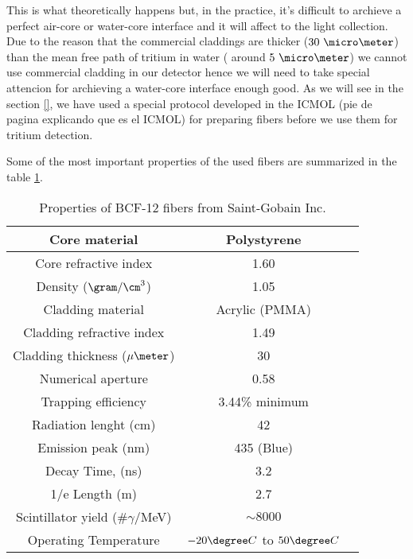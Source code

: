 This is what theoretically happens but, in the practice, it's difficult to archieve a perfect air-core or water-core interface and it will affect to the light collection. Due to the reason that the commercial claddings are thicker ($30~\micro \meter$) than the mean free path of tritium in water ( around $5~\micro\meter$) we cannot use commercial cladding in our detector hence we will need to take special attencion for archieving a water-core interface enough good. As we will see in the section \ref{}, we have used a special protocol developed in the ICMOL (pie de pagina explicando que es el ICMOL) for preparing fibers before we use them for tritium detection.

Some of the most important properties of the used fibers are summarized in the table \ref{tab:ParametersFibersBCF12}.

\begin{table}[htbp]
\begin{center}
\begin{tabular}{|c|c|c|}
\hline \hline 
Core material & Polystyrene \\ \hline
Core refractive index & 1.60 \\ \hline
Density ($\gram/\cm^3$) & 1.05 \\ \hline
Cladding material & Acrylic (PMMA) \\ \hline
Cladding refractive index & 1.49 \\ \hline
Cladding thickness ($\mu\meter$) & 30 \\ \hline
Numerical aperture & 0.58 \\ \hline
Trapping efficiency & 3.44\% minimum \\ \hline
Radiation lenght (cm) & 42 \\ \hline
Emission peak (nm) & 435 (Blue) \\ \hline
Decay Time, (ns) & 3.2 \\ \hline
1/e Length (m) & 2.7 \\ \hline
Scintillator yield (\#$\gamma$/MeV) & $\sim 8000$ \\ \hline
Operating Temperature & $-20\degree C$ to $50\degree C$ \\ \hline
\end{tabular}
\caption{Properties of BCF-12 fibers from Saint-Gobain Inc. \cite{DataSheetBCF12Fiber}}
\label{tab:ParametersFibersBCF12}
\end{center}
\end{table}


